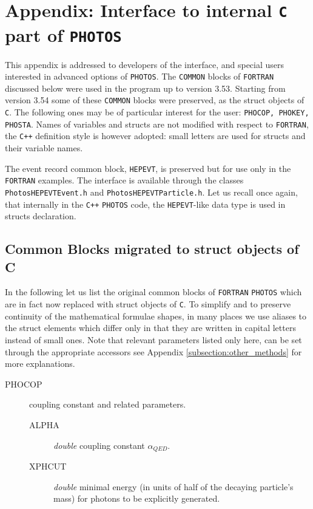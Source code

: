 \documentclass[]{Photos_interface_design}
\begin{document}
{}
% 






\newpage
\appendix

\section{Appendix: Interface to internal {\tt C} part of {\tt PHOTOS}}
\label{Interface to PHOTOS}


This appendix is addressed to developers of the interface,
and special users interested in advanced options of {\tt PHOTOS}.
The {\tt COMMON} blocks of {\tt FORTRAN} discussed below were used in the
program up  to version 3.53.
Starting from version 3.54 some of these {\tt COMMON}  blocks were preserved,
as the struct objects of {\tt C}. The following ones may be of particular interest for the
user:
{\tt PHOCOP, PHOKEY, PHOSTA}.
Names of variables and structs are not modified with respect to {\tt FORTRAN}, 
the  {\tt C++} definition style is however adopted: small letters are used 
for structs and their variable names.

The event record common block, {\tt HEPEVT}, is preserved but for use only in the {\tt FORTRAN} examples.  
The interface is available
through the classes {\tt PhotosHEPEVTEvent.h} and {\tt PhotosHEPEVTParticle.h}.
Let us recall once again, that internally in the {\tt C++} {\tt PHOTOS} code, the {\tt HEPEVT}-like  data type
is used in structs declaration.

\subsection{Common Blocks migrated to struct objects of C}

In the following let us list the original common blocks of {\tt FORTRAN} {\tt PHOTOS} which are in fact now replaced with struct objects of {\tt C}. 
To simplify 
and to preserve continuity of  the mathematical formulae shapes,
in many places  we  use  aliases to the struct elements  
which differ only in that they are  written in capital letters instead of small ones.
Note that relevant parameters  listed only here, can be set through
the appropriate accessors see Appendix \ref{subsection:other_methods}  for more explanations.


\begin{description}
\item[PHOCOP] coupling constant and related parameters.
    \begin{description}
	\item[ALPHA]  \textit{double} coupling constant $\alpha_{QED}$.
	\item[XPHCUT] \textit{double} minimal energy (in units of half of the decaying particle's mass) for photons to be explicitly generated.
    \end{description}
\end{description}
\end{document}
